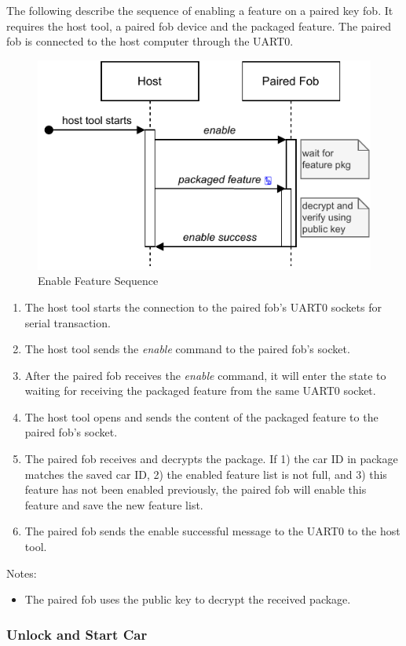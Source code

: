 \documentclass[11pt,oneside,onecolumn,letterpaper]{article}
\begin{document}
The following describe the sequence of enabling a feature on a paired key fob. It requires the host tool, a paired fob device and the packaged feature. The paired fob is connected to the host computer through the UART0.

\begin{figure}[!htbp]
	\begin{centering}
		\includegraphics[width = .5\textwidth]{pic/enable.pdf}
		\caption{Enable Feature Sequence}
		\label{fig:enable}
	\end{centering}
\end{figure}

\begin{enumerate}
	\item The host tool starts the connection to the paired fob's UART0 sockets for serial transaction.
	\item The host tool sends the \textit{enable} command to the paired fob's socket.
	\item After the paired fob receives the \textit{enable} command, it will enter the state to waiting for receiving the packaged feature from the same UART0 socket.
	\item The host tool opens and sends the content of the packaged feature to the paired fob's socket.
	\item The paired fob receives and decrypts the package. If 1) the car ID in package matches the saved car ID, 2) the enabled feature list is not full, and 3) this feature has not been  enabled previously, the paired fob will enable this feature and save the new feature list.
	\item The paired fob sends the enable successful message to the UART0 to the host tool.
\end{enumerate}

Notes:
\begin{itemize}
	\item The paired fob uses the public key to decrypt the received package.
\end{itemize}

\subsubsection{Unlock and Start Car}
\end{document}
